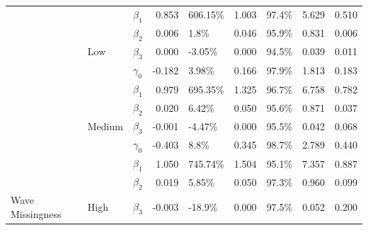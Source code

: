 \documentclass{svjour3}\usepackage[]{graphicx}\usepackage[]{color}
\newenvironment{knitrout}{}{} %
\begin{document}
\begin{knitrout}
\begin{table}[!h]
{\begin{tabular}[t]{l|l|l|r|l|r|l|r|r}
 &  & $\beta_1$ & 0.853 & 606.15\% & 1.003 & 97.4\% & 5.629 & 0.510\\

 &  & $\beta_2$ & 0.006 & 1.8\% & 0.046 & 95.9\% & 0.831 & 0.006\\

 & \multirow{-4}{*}{\raggedright\arraybackslash Low} & $\beta_3$ & 0.000 & -3.05\% & 0.000 & 94.5\% & 0.039 & 0.011\\

 &  & $\gamma_0$ & -0.182 & 3.98\% & 0.166 & 97.9\% & 1.813 & 0.183\\

 &  & $\beta_1$ & 0.979 & 695.35\% & 1.325 & 96.7\% & 6.758 & 0.782\\

 &  & $\beta_2$ & 0.020 & 6.42\% & 0.050 & 95.6\% & 0.871 & 0.037\\

 & \multirow{-4}{*}{\raggedright\arraybackslash Medium} & $\beta_3$ & -0.001 & -4.47\% & 0.000 & 95.5\% & 0.042 & 0.068\\

 &  & $\gamma_0$ & -0.403 & 8.8\% & 0.345 & 98.7\% & 2.789 & 0.440\\

 &  & $\beta_1$ & 1.050 & 745.74\% & 1.504 & 95.1\% & 7.357 & 0.887\\

 &  & $\beta_2$ & 0.019 & 5.85\% & 0.050 & 97.3\% & 0.960 & 0.099\\

\multirow{-12}{*}{\raggedright\arraybackslash Wave Missingness} & \multirow{-4}{*}{\raggedright\arraybackslash High} & $\beta_3$ & -0.003 & -18.9\% & 0.000 & 97.5\% & 0.052 & 0.200\\
\hline
\end{tabular}}
\end{table}


\end{knitrout}

\end{document}
